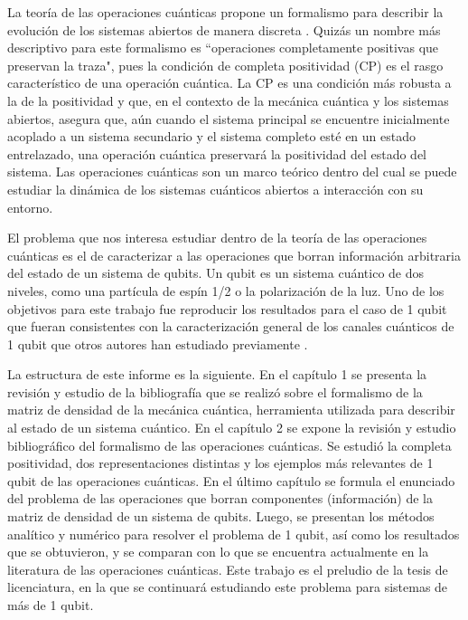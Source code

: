 La teoría de las operaciones cuánticas propone un formalismo para
describir la evolución de los sistemas abiertos de manera discreta
\cite{nielsen_chuang_2011}. 
Quizás un nombre más descriptivo para este formalismo es 
``operaciones completamente positivas que preservan la traza",
pues la condición de completa positividad (CP) es el rasgo característico 
de una operación cuántica. La CP es una condición más robusta 
a la de la positividad y que, en el contexto de la
mecánica cuántica y los sistemas abiertos, asegura que, aún 
cuando el sistema principal se encuentre inicialmente acoplado 
a un sistema secundario y el sistema completo esté en 
un estado entrelazado, una operación cuántica preservará 
la positividad del estado del sistema. Las operaciones cuánticas son un
marco teórico dentro del cual se puede estudiar la dinámica de los 
sistemas cuánticos abiertos a interacción con su entorno.

El problema que nos interesa estudiar dentro de la teoría de 
las operaciones cuánticas es el de caracterizar a las
operaciones que borran información arbitraria del estado de un sistema
de qubits. Un qubit es un sistema cuántico de dos niveles, 
como una partícula de espín 1/2 o la polarización de la luz. 
Uno de los objetivos para este trabajo fue reproducir los
resultados para el caso de 1 qubit que fueran 
consistentes con la caracterización general de 
los canales cuánticos de 1 qubit que otros autores han 
estudiado previamente 
\cite{bengtsson_zyczkowski_2017,nielsen_chuang_2011}.

La estructura de este informe es la siguiente. En el capítulo 1
se presenta la revisión y estudio de la bibliografía que se realizó 
sobre el formalismo de la matriz de densidad de la mecánica cuántica, 
herramienta utilizada para describir 
al estado de un sistema cuántico. En el capítulo 2 se expone 
la revisión y estudio bibliográfico del formalismo de las 
operaciones cuánticas. Se estudió la completa positividad, 
dos representaciones distintas y los ejemplos más relevantes 
de 1 qubit de las operaciones cuánticas. En el último capítulo
se formula el enunciado del problema de las operaciones que borran 
componentes (información) de la matriz de densidad de un sistema de 
qubits. Luego, se presentan los métodos analítico y numérico 
para resolver el problema de 1 qubit, así como los resultados 
que se obtuvieron, y se comparan con lo que se encuentra actualmente
en la literatura de las operaciones cuánticas. Este trabajo 
es el preludio de la tesis de licenciatura, en la que se continuará 
estudiando este problema para sistemas de más de 1 qubit.


